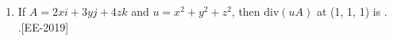 \documentclass[journal]{IEEEtran}
\begin{document}
\begin{enumerate}
\begin{multicols}{4}
    
    \begin{enumerate}
        \item 0 $A$
        \item $\frac{100}{\sqrt{3}}$ $A$
        \item 100 $A$
        \item 300 $A$
    \end{enumerate}
    \end{multicols}
    \item If $A = 2x i + 3y j + 4z k$ and $u = x^2 + y^2 + z^2$, then $\text{div}(uA)$ at (1, 1, 1) is \underline{\hspace{2cm}}. \\.\hfill{[EE-2019]}




\end{enumerate}
\end{document}
